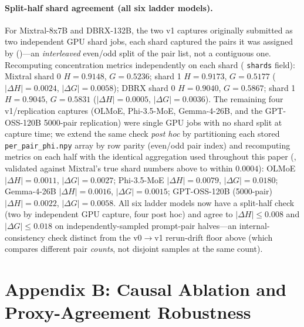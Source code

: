 \documentclass[sigconf]{acmart}
\begin{document}
\paragraph{Split-half shard agreement (all six ladder models).}
For Mixtral-8x7B and DBRX-132B, the two v1 captures originally submitted
as two independent GPU shard jobs, each shard captured the pairs it was
assigned by 
()---an \emph{interleaved} even/odd split
of the pair list, not a contiguous one. Recomputing concentration metrics
independently on each shard ( \texttt{shards} field): Mixtral shard 0
$H{=}0.9148$, $G{=}0.5236$; shard 1 $H{=}0.9173$, $G{=}0.5177$
($|\Delta H|{=}0.0024$, $|\Delta G|{=}0.0058$); DBRX shard 0 $H{=}0.9040$,
$G{=}0.5867$; shard 1 $H{=}0.9045$, $G{=}0.5831$ ($|\Delta H|{=}0.0005$,
$|\Delta G|{=}0.0036$).
The remaining four v1/replication captures (OLMoE, Phi-3.5-MoE,
Gemma-4-26B, and the GPT-OSS-120B 5000-pair replication) were single GPU
jobs with no shard split at capture time; we extend the same check
\emph{post hoc} by partitioning each stored \texttt{per\_pair\_phi.npy}
array by row parity (even/odd pair index) and recomputing metrics on each
half with the identical aggregation used throughout this paper
(, validated
against Mixtral's true shard numbers above to within $0.0004$):
OLMoE $|\Delta H|{=}0.0011$, $|\Delta G|{=}0.0027$; Phi-3.5-MoE
$|\Delta H|{=}0.0079$, $|\Delta G|{=}0.0180$; Gemma-4-26B
$|\Delta H|{=}0.0016$, $|\Delta G|{=}0.0015$; GPT-OSS-120B (5000-pair)
$|\Delta H|{=}0.0022$, $|\Delta G|{=}0.0058$. All six ladder models now
have a split-half check (two by independent GPU capture, four post hoc)
and agree to $|\Delta H| \le 0.008$ and $|\Delta G| \le 0.018$ on
independently-sampled prompt-pair halves---an internal-consistency check
distinct from the v0$\rightarrow$v1 rerun-drift floor above (which
compares different pair \emph{counts}, not disjoint samples at the same
count).

\section*{Appendix B: Causal Ablation and Proxy-Agreement Robustness}
\label{app:causal}
\end{document}
